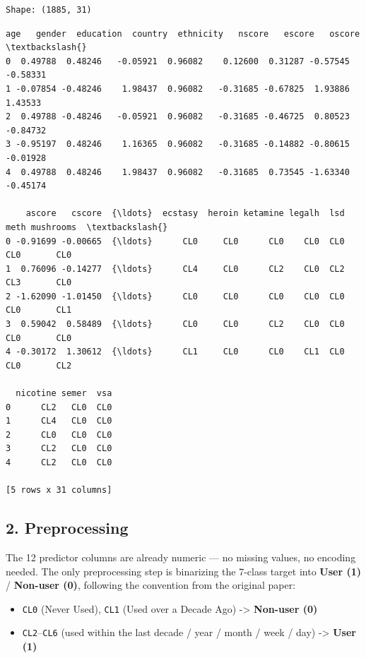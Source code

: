 \documentclass[11pt]{article}
\makeatletter
\providecommand{\tightlist}{%
      \setlength{\itemsep}{0pt}\setlength{\parskip}{0pt}}
\newcommand{\boxspacing}{\kern\kvtcb@left@rule\kern\kvtcb@boxsep}
\newcommand{\prompt}[4]{
        {\ttfamily\llap{{\color{#2}[#3]:\hspace{3pt}#4}}\vspace{-\baselineskip}}
    }
\makeatother
\begin{document}
    \begin{Verbatim}[commandchars=\\\{\}]
Shape: (1885, 31)
    \end{Verbatim}

            \begin{tcolorbox}[breakable, size=fbox, boxrule=.5pt, pad at break*=1mm, opacityfill=0]
\prompt{Out}{outcolor}{2}{\boxspacing}
\begin{Verbatim}[commandchars=\\\{\}]
       age   gender  education  country  ethnicity   nscore   escore   oscore  \textbackslash{}
0  0.49788  0.48246   -0.05921  0.96082    0.12600  0.31287 -0.57545 -0.58331
1 -0.07854 -0.48246    1.98437  0.96082   -0.31685 -0.67825  1.93886  1.43533
2  0.49788 -0.48246   -0.05921  0.96082   -0.31685 -0.46725  0.80523 -0.84732
3 -0.95197  0.48246    1.16365  0.96082   -0.31685 -0.14882 -0.80615 -0.01928
4  0.49788  0.48246    1.98437  0.96082   -0.31685  0.73545 -1.63340 -0.45174

    ascore   cscore  {\ldots}  ecstasy  heroin ketamine legalh  lsd meth mushrooms  \textbackslash{}
0 -0.91699 -0.00665  {\ldots}      CL0     CL0      CL0    CL0  CL0  CL0       CL0
1  0.76096 -0.14277  {\ldots}      CL4     CL0      CL2    CL0  CL2  CL3       CL0
2 -1.62090 -1.01450  {\ldots}      CL0     CL0      CL0    CL0  CL0  CL0       CL1
3  0.59042  0.58489  {\ldots}      CL0     CL0      CL2    CL0  CL0  CL0       CL0
4 -0.30172  1.30612  {\ldots}      CL1     CL0      CL0    CL1  CL0  CL0       CL2

  nicotine semer  vsa
0      CL2   CL0  CL0
1      CL4   CL0  CL0
2      CL0   CL0  CL0
3      CL2   CL0  CL0
4      CL2   CL0  CL0

[5 rows x 31 columns]
\end{Verbatim}
\end{tcolorbox}
        
    \subsection{2. Preprocessing}\label{preprocessing}

The 12 predictor columns are already numeric --- no missing values, no
encoding needed. The only preprocessing step is binarizing the 7-class
target into \textbf{User (1)} / \textbf{Non-user (0)}, following the
convention from the original paper:

\begin{itemize}
\tightlist
\item
  \texttt{CL0} (Never Used), \texttt{CL1} (Used over a Decade Ago)
  -\textgreater{} \textbf{Non-user (0)}
\item
  \texttt{CL2}--\texttt{CL6} (used within the last decade / year / month
  / week / day) -\textgreater{} \textbf{User (1)}
\end{itemize}
\end{document}
